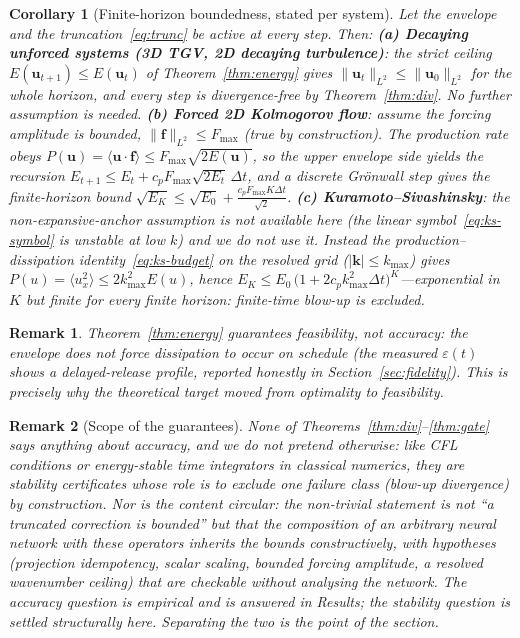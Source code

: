 \documentclass[11pt,a4paper]{article}
\newtheorem{corollary}{Corollary}
\newtheorem{remark}{Remark}
\newcommand{\bu}{\bm{u}}
\newcommand{\Ex}{E}
\begin{document}
\begin{corollary}[Finite-horizon boundedness, stated per system]\label{cor:bounded}
Let the envelope and the truncation~\eqref{eq:trunc} be active at every step. Then:
\textbf{(a) Decaying unforced systems (3D TGV, 2D decaying turbulence)}: the strict ceiling $\Ex(\bu_{t+1})\le\Ex(\bu_t)$ of Theorem~\ref{thm:energy} gives $\|\bu_t\|_{L^2}\le\|\bu_0\|_{L^2}$ for the whole horizon, and every step is divergence-free by Theorem~\ref{thm:div}. No further assumption is needed.
\textbf{(b) Forced 2D Kolmogorov flow}: assume the forcing amplitude is bounded, $\|\bm f\|_{L^2}\le F_{\max}$ (true by construction). The production rate obeys $P(\bu)=\langle\bu\!\cdot\!\bm f\rangle\le F_{\max}\sqrt{2\Ex(\bu)}$, so the upper envelope side yields the recursion $\Ex_{t+1}\le\Ex_t+c_pF_{\max}\sqrt{2\Ex_t}\,\Delta t$, and a discrete Gr\"onwall step gives the finite-horizon bound
$\sqrt{\Ex_K}\le\sqrt{\Ex_0}+\tfrac{c_pF_{\max}K\Delta t}{\sqrt{2}}$.
\textbf{(c) Kuramoto--Sivashinsky}: the non-expansive-anchor assumption is \emph{not} available here (the linear symbol~\eqref{eq:ks-symbol} is unstable at low $k$) and we do not use it. Instead the production--dissipation identity~\eqref{eq:ks-budget} on the resolved grid ($|\bm k|\le k_{\max}$) gives $P(u)=\langle u_x^2\rangle\le 2k_{\max}^2\Ex(u)$, hence
$\Ex_K\le\Ex_0\,\big(1+2c_pk_{\max}^2\Delta t\big)^{K}$---exponential in $K$ but finite for every finite horizon: finite-time blow-up is excluded.
\end{corollary}

\begin{remark}
Theorem~\ref{thm:energy} guarantees \emph{feasibility}, not \emph{accuracy}: the envelope does not force dissipation to occur on schedule (the measured $\varepsilon(t)$ shows a delayed-release profile, reported honestly in Section~\ref{sec:fidelity}). This is precisely why the theoretical target moved from optimality to feasibility.
\end{remark}

\begin{remark}[Scope of the guarantees]
None of Theorems~\ref{thm:div}--\ref{thm:gate} says anything about accuracy, and we do not pretend otherwise: like CFL conditions or energy-stable time integrators in classical numerics, they are \emph{stability certificates} whose role is to exclude one failure class (blow-up divergence) by construction. Nor is the content circular: the non-trivial statement is not ``a truncated correction is bounded'' but that the \emph{composition} of an arbitrary neural network with these operators inherits the bounds constructively, with hypotheses (projection idempotency, scalar scaling, bounded forcing amplitude, a resolved wavenumber ceiling) that are checkable without analysing the network. The accuracy question is empirical and is answered in Results; the stability question is settled structurally here. Separating the two is the point of the section.
\end{remark}
\end{document}
